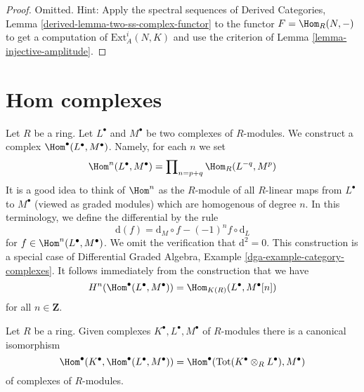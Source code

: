 \begin{proof}
Omitted. Hint: Apply the spectral sequences of
Derived Categories, Lemma \ref{derived-lemma-two-ss-complex-functor}
to the functor $F = \Hom_R(N, -)$ to get a computation of
$\text{Ext}^i_A(N, K)$ and use the criterion of
Lemma \ref{lemma-injective-amplitude}.
\end{proof}







\section{Hom complexes}
\label{section-hom-complexes}

\noindent
Let $R$ be a ring. Let $L^\bullet$ and $M^\bullet$ be two complexes
of $R$-modules. We construct a complex $\Hom^\bullet(L^\bullet, M^\bullet)$.
Namely, for each $n$ we set
$$
\Hom^n(L^\bullet, M^\bullet) =
\prod\nolimits_{n = p + q} \Hom_R(L^{-q}, M^p)
$$
It is a good idea to think of $\Hom^n$ as the $R$-module of all $R$-linear
maps from $L^\bullet$ to $M^\bullet$ (viewed as graded modules)
which are homogenous of degree $n$. In this terminology, we define the
differential by the rule
$$
\text{d}(f) = \text{d}_M \circ f - (-1)^n f \circ \text{d}_L
$$
for $f \in \Hom^n(L^\bullet, M^\bullet)$.
We omit the verification that $\text{d}^2 = 0$.
This construction is a special case of
Differential Graded Algebra, Example \ref{dga-example-category-complexes}.
It follows immediately from the construction that we have
\begin{equation}
\label{equation-cohomology-hom-complex}
H^n(\Hom^\bullet(L^\bullet, M^\bullet)) = \Hom_{K(R)}(L^\bullet, M^\bullet[n])
\end{equation}
for all $n \in \mathbf{Z}$.

\begin{lemma}
\label{lemma-compose}
Let $R$ be a ring. Given complexes $K^\bullet, L^\bullet, M^\bullet$
of $R$-modules there is a canonical isomorphism
$$
\Hom^\bullet(K^\bullet, \Hom^\bullet(L^\bullet, M^\bullet))
=
\Hom^\bullet(\text{Tot}(K^\bullet \otimes_R L^\bullet), M^\bullet)
$$
of complexes of $R$-modules.
\end{lemma}

